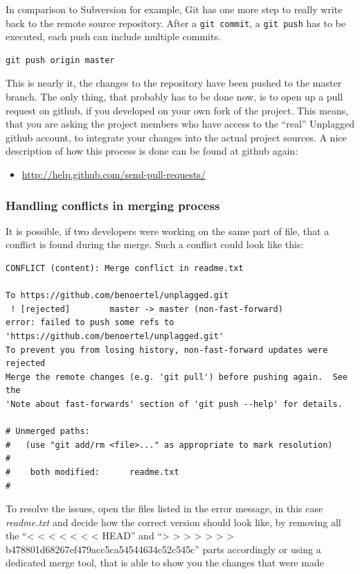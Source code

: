 In comparison to Subversion for example, Git has one more step to really write back to the remote source repository. 
After a \texttt{git commit}, a \texttt{git push} has to be executed, each push can include multiple commits.

\begin{lstlisting}[caption=Pushing to the server]
git push origin master
\end{lstlisting}

This is nearly it, the changes to the repository have been pushed to the master branch. The only thing, that probably 
has to be done
now, is to open up a pull request on github, if you developed on your own fork of the project. This means, that you 
are
asking the project members who have access to the \enquote{real} Unplagged github account, to integrate your changes 
into the actual project
sources. A nice description of how this process is done can be found at github again:

\begin{itemize}
\item \url{http://help.github.com/send-pull-requests/}
\end{itemize}

\subsubsection{Handling conflicts in merging process}

It is possible, if two developers were working on the same part of  file, that a conflict is found during the merge. 
Such 
a conflict could look like this:

\begin{lstlisting}[caption=Merge conflict, keywordstyle=\color{black}]
CONFLICT (content): Merge conflict in readme.txt

To https://github.com/benoertel/unplagged.git
 ! [rejected]        master -> master (non-fast-forward)
error: failed to push some refs to 'https://github.com/benoertel/unplagged.git'
To prevent you from losing history, non-fast-forward updates were rejected
Merge the remote changes (e.g. 'git pull') before pushing again.  See the
'Note about fast-forwards' section of 'git push --help' for details.

# Unmerged paths:
#   (use "git add/rm <file>..." as appropriate to mark resolution)
#
#    both modified:      readme.txt
#
\end{lstlisting}

To resolve the issues, open the files listed in the error message, in this case \textit{readme.txt} and decide how 
the correct 
version should look like, by removing all the \enquote{< < < < < < <  HEAD} and 
\enquote{> > > > > > > b478801d68267ef479acc5ca54544634c52c545c} 
parts accordingly or using a dedicated merge tool, that is able to show you the changes that were made

